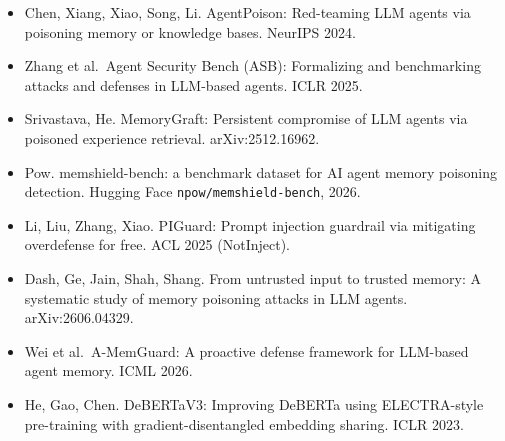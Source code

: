 \documentclass[
]{article}
\providecommand{\tightlist}{%
  \setlength{\itemsep}{0pt}\setlength{\parskip}{0pt}}
\begin{document}
\begin{itemize}
\tightlist
\item
  Chen, Xiang, Xiao, Song, Li. AgentPoison: Red-teaming LLM agents via
  poisoning memory or knowledge bases. NeurIPS 2024.
\item
  Zhang et al.~Agent Security Bench (ASB): Formalizing and benchmarking
  attacks and defenses in LLM-based agents. ICLR 2025.
\item
  Srivastava, He. MemoryGraft: Persistent compromise of LLM agents via
  poisoned experience retrieval. arXiv:2512.16962.
\item
  Pow. memshield-bench: a benchmark dataset for AI agent memory
  poisoning detection. Hugging Face \texttt{npow/memshield-bench}, 2026.
\item
  Li, Liu, Zhang, Xiao. PIGuard: Prompt injection guardrail via
  mitigating overdefense for free. ACL 2025 (NotInject).
\item
  Dash, Ge, Jain, Shah, Shang. From untrusted input to trusted memory: A
  systematic study of memory poisoning attacks in LLM agents.
  arXiv:2606.04329.
\item
  Wei et al.~A-MemGuard: A proactive defense framework for LLM-based
  agent memory. ICML 2026.
\item
  He, Gao, Chen. DeBERTaV3: Improving DeBERTa using ELECTRA-style
  pre-training with gradient-disentangled embedding sharing. ICLR 2023.
\end{itemize}
\end{document}
